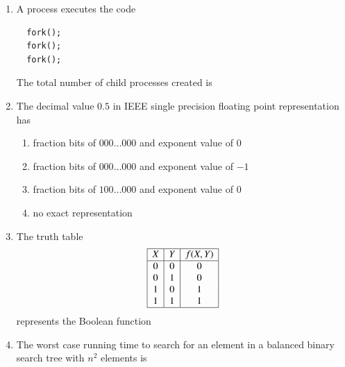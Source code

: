 \documentclass[journal]{IEEEtran}
\numberwithin{equation}{enumi}
\numberwithin{figure}{enumi}
\begin{document}
\begin{enumerate}
\item A process executes the code
  \begin{verbatim}
  fork();
  fork();
  fork();
  \end{verbatim}
  The total number of child processes created is  
  \begin{enumerate}
\end{enumerate}
  
\item The decimal value $0.5$ in IEEE single precision floating point representation has  
\begin{enumerate}
    \item fraction bits of $000\ldots000$ and exponent value of $0$
    \item fraction bits of $000\ldots000$ and exponent value of $-1$
    \item fraction bits of $100\ldots000$ and exponent value of $0$
    \item no exact representation
\end{enumerate}

\item The truth table  
  \[
  \begin{array}{|c|c|c|}
  \hline
  X & Y & f(X,Y) \\
  \hline
  0 & 0 & 0 \\
  0 & 1 & 0 \\
  1 & 0 & 1 \\
  1 & 1 & 1 \\
  \hline
  \end{array}
  \]
  represents the Boolean function
\begin{enumerate}
\end{enumerate}
  
\item The worst case running time to search for an element in a balanced binary search tree with $n^{2}$ elements is
\begin{enumerate}
\end{enumerate}  
  

\end{enumerate}
\end{document}
